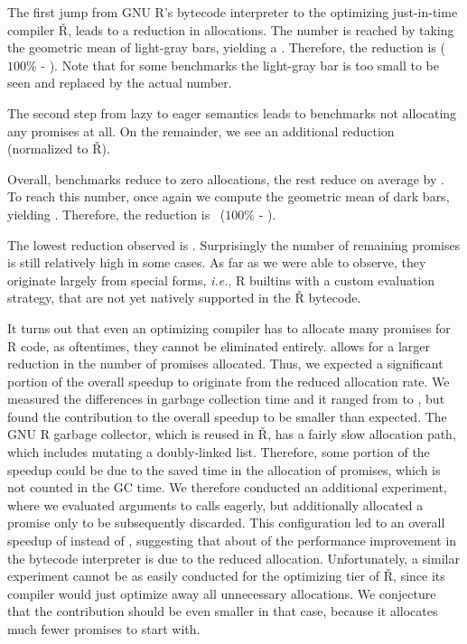 \documentclass[review,creen,acmsmall]{acmart}
\renewcommand{\Rsh}{{\sf\v R}\xspace}
\newcommand{\ie}{\emph{i.e.},\xspace}
\begin{document}
The first jump from GNU R's bytecode interpreter to the optimizing just-in-time
compiler \Rsh, leads to a \promiseAlocationReductionGnurRsh reduction in
allocations. The number is reached by taking the geometric mean of light-gray
bars, yielding a \promiseAllocationGnurRsh. Therefore, the reduction is
\promiseAlocationReductionGnurRsh ({$100\%$\xspace} -
\promiseAllocationGnurRsh). Note that for some benchmarks the light-gray bar is
too small to be seen and replaced by the actual number.

The second step from lazy to eager semantics leads to
\promiseAlocationReductionRshStrictToZero benchmarks not allocating any promises
at all. On the remainder, we see an additional
\promiseAlocationReductionRshStrict reduction (\rshstrict normalized to \Rsh).

Overall, \promiseAlocationReductionRshStrictToZero benchmarks reduce to zero
allocations, the rest reduce on average by
\promiseAlocationReductionGnurRshStrict. To reach this number, once again we
compute the geometric mean of dark bars, yielding
\promiseAllocatioGnurRshStrict. Therefore, the reduction is
~\promiseAlocationReductionGnurRshStrict ({$100\%$\xspace} -
\promiseAllocatioGnurRshStrict).

The lowest reduction observed is \promiseAlocationReductionGnurRshStrictMin.
Surprisingly the number of remaining promises is still relatively high in some
cases. As far as we were able to observe, they originate largely from special
forms, \ie R builtins with a custom evaluation strategy, that are not yet
natively supported in the \Rsh bytecode.

It turns out that even an optimizing compiler has to allocate many promises for
R code, as oftentimes, they cannot be eliminated entirely. \rshstrict allows for
a larger reduction in the number of promises allocated. Thus, we expected a
significant portion of the overall speedup to originate from the reduced
allocation rate. We measured the differences in garbage collection time and it
ranged from \speedupGCRshStrictMin to \speedupGCRshStrictMax, but found the
contribution to the overall speedup to be smaller than expected. The GNU R
garbage collector, which is reused in \Rsh, has a fairly slow allocation path,
which includes mutating a doubly-linked list. Therefore, some portion of the
speedup could be due to the saved time in the allocation of promises, which is
not counted in the GC time. We therefore conducted an additional experiment,
where we evaluated arguments to calls eagerly, but additionally allocated a
promise only to be subsequently discarded. This configuration led to an overall
speedup of \speedupBCRshStrictAlloc instead of \speedupBCRshStrict, suggesting
that about \speedupDueToReducedGC of the performance improvement in the bytecode
interpreter is due to the reduced allocation. Unfortunately, a similar
experiment cannot be as easily conducted for the optimizing tier of \Rsh, since
its compiler would just optimize away all unnecessary allocations. We conjecture
that the contribution should be even smaller in that case, because it allocates
much fewer promises to start with.
\end{document}
